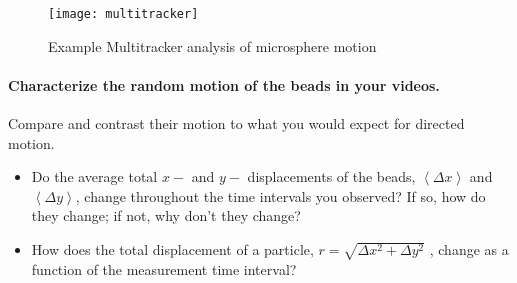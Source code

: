 \begin{figure}[ht]
	\centering
	\texttt{[image: multitracker]}
	\caption{Example Multitracker analysis of microsphere motion}
	\label{fig:multitracker}
\end{figure}

\paragraph*{Characterize the random motion of the beads in your videos.} Compare and contrast their motion to what you would expect for directed motion.
\begin{itemize}
\item Do the average total $x-$ and $y-$ displacements of the beads, $\left \langle \Delta x \right \rangle$ and $\left \langle \Delta y \right \rangle$, change throughout the time intervals you observed? If so, how do they change; if not, why don't they change?
\item How does the total displacement of a particle, $r=\sqrt{\Delta x^2+\Delta y^2}$ , change as a function of the measurement time interval?
\end{itemize}
%

